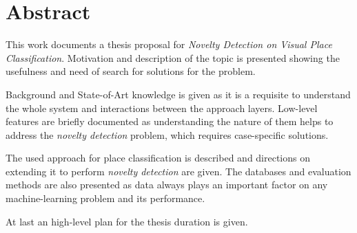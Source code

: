 \chapter*{Abstract}
This work documents a thesis proposal for \emph{Novelty Detection on Visual Place Classification}.
Motivation and description of the topic is presented showing the usefulness and need of search for solutions for the problem.

Background and State-of-Art knowledge is given as it is a requisite to understand the whole system and interactions between the approach layers.
Low-level features are briefly documented as understanding the nature of them helps to address the \emph{novelty detection} problem, which requires case-specific solutions.

The used approach for place classification is described and directions on extending it to perform \emph{novelty detection} are given.
The databases and evaluation methods are also presented as data always plays an important factor on any machine-learning problem and its performance.

At last an high-level plan for the thesis duration is given.

